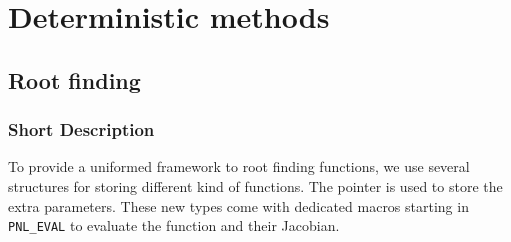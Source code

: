 \section{Deterministic methods}

\subsection{Root finding}
\subsubsection{Short Description}

To provide a uniformed framework to root finding functions, we use several
structures for storing different kind of functions. The pointer
 is used to store the extra parameters. These new types come
with dedicated macros starting in \verb!PNL_EVAL!  to evaluate the function
and their Jacobian.
